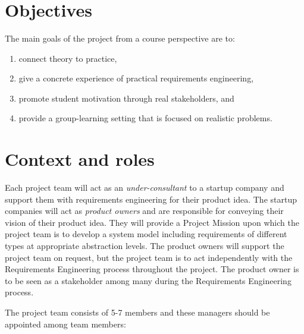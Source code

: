 \documentclass[10pt,a4paper]{article}
\title{\bf\sffamily\fontsize{18}{18}\selectfont{
Project Description\\ ETSN15 Requirements Engineering\\http://cs.lth.se/krav
}}
\author{\bf\sffamily\fontsize{12}{12}\selectfont{Björn Regnell, Elizabeth Bjarnason, Johan Linåker}}
\date{\bf\sffamily\fontsize{10}{10}\selectfont{Study period: 2020-VT1, Revision date: \today}}
\begin{document}
\maketitle
\vspace{-1cm}

\section{Objectives}
The main goals of the project from a course perspective are to:
\begin{enumerate}[noitemsep]
\item connect theory to practice,
\item give a concrete experience of practical requirements engineering,
\item promote student motivation through real stakeholders, and
\item provide a group-learning setting that is focused on realistic problems.
\end{enumerate}


\section{Context and roles}

\noindent Each project team will act as an \textit{under-consultant} to a startup company and support them with requirements engineering for their product idea. The startup companies will act as \textit{product owners} and are responsible for conveying their vision of their product idea. They will provide a Project Mission upon which the project team is to develop a system model including requirements of different types at appropriate abstraction levels. The product owners will support the project team on request, but the project team is to act independently with the Requirements Engineering process throughout the project. The product owner is to be seen as a stakeholder among many during the Requirements Engineering process.
\newline

\noindent The project team consists of 5-7 members and these managers should be appointed among team members:
\end{document}
